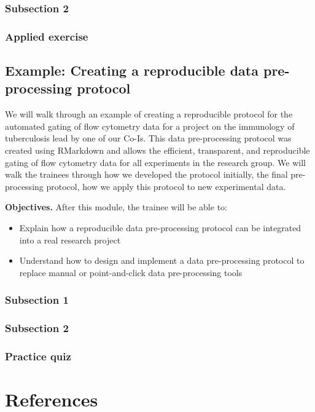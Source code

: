 \documentclass[]{tufte-book}
\providecommand{\tightlist}{%
  \setlength{\itemsep}{0pt}\setlength{\parskip}{0pt}}
\begin{document}
\hypertarget{subsection-2}{%
\subsection{Subsection 2}\label{subsection-2}}

\hypertarget{applied-exercise}{%
\subsection{Applied exercise}\label{applied-exercise}}

\hypertarget{example-creating-a-reproducible-data-pre-processing-protocol}{%
\section{Example: Creating a reproducible data pre-processing protocol}\label{example-creating-a-reproducible-data-pre-processing-protocol}}

We will walk through an example of creating a reproducible protocol for the
automated gating of flow cytometry data for a project on the immunology of
tuberculosis lead by one of our Co-Is. This data pre-processing protocol was
created using RMarkdown and allows the efficient, transparent, and reproducible
gating of flow cytometry data for all experiments in the research group. We will
walk the trainees through how we developed the protocol initially, the final
pre-processing protocol, how we apply this protocol to new experimental data.

\textbf{Objectives.} After this module, the trainee will be able to:

\begin{itemize}
\tightlist
\item
  Explain how a reproducible data pre-processing protocol can be integrated into
  a real research project
\item
  Understand how to design and implement a data pre-processing protocol to
  replace manual or point-and-click data pre-processing tools
\end{itemize}

\hypertarget{subsection-1}{%
\subsection{Subsection 1}\label{subsection-1}}

\hypertarget{subsection-2}{%
\subsection{Subsection 2}\label{subsection-2}}

\hypertarget{practice-quiz}{%
\subsection{Practice quiz}\label{practice-quiz}}

\hypertarget{references}{%
\chapter{References}\label{references}}


\end{document}
